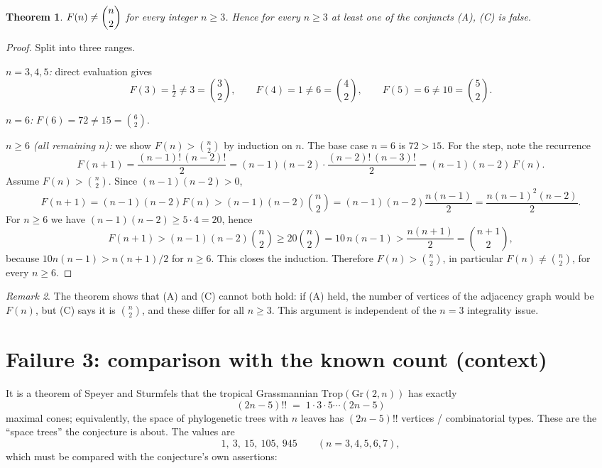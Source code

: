 \documentclass[11pt]{article}
\newtheorem{theorem}{Theorem}
\theoremstyle{definition}
\theoremstyle{remark}
\newtheorem{remark}[theorem]{Remark}
\begin{document}
\begin{theorem}
\label{thm:mismatch}
$F(n) \neq \dbinom{n}{2}$ for every integer $n \ge 3$. Hence for every $n \ge 3$ at
least one of the conjuncts (A), (C) is false.
\end{theorem}

\begin{proof}
Split into three ranges.

\emph{$n = 3,4,5$:} direct evaluation gives
\[
F(3) = \tfrac12 \neq 3 = \binom{3}{2},\qquad
F(4) = 1 \neq 6 = \binom{4}{2},\qquad
F(5) = 6 \neq 10 = \binom{5}{2}.
\]

\emph{$n = 6$:} $F(6) = 72 \neq 15 = \binom{6}{2}$.

\emph{$n \ge 6$ (all remaining $n$):} we show $F(n) > \binom{n}{2}$ by induction on
$n$. The base case $n = 6$ is $72 > 15$. For the step, note the recurrence
\[
F(n+1) = \frac{(n-1)!\,(n-2)!}{2}
       = (n-1)(n-2) \cdot \frac{(n-2)!\,(n-3)!}{2}
       = (n-1)(n-2)\,F(n).
\]
Assume $F(n) > \binom{n}{2}$. Since $(n-1)(n-2) > 0$,
\[
F(n+1) = (n-1)(n-2) F(n) > (n-1)(n-2)\binom{n}{2}
       = (n-1)(n-2)\frac{n(n-1)}{2} = \frac{n(n-1)^2(n-2)}{2}.
\]
For $n \ge 6$ we have $(n-1)(n-2) \ge 5 \cdot 4 = 20$, hence
\[
F(n+1) > (n-1)(n-2)\binom{n}{2} \ge 20\binom{n}{2} = 10\,n(n-1)
      > \frac{n(n+1)}{2} = \binom{n+1}{2},
\]
because $10n(n-1) > n(n+1)/2$ for $n \ge 6$. This closes the induction. Therefore
$F(n) > \binom{n}{2}$, in particular $F(n) \neq \binom{n}{2}$, for every $n \ge 6$.
\end{proof}

\begin{remark}
The theorem shows that (A) and (C) cannot both hold: if (A) held, the number of
vertices of the adjacency graph would be $F(n)$, but (C) says it is $\binom{n}{2}$,
and these differ for all $n \ge 3$. This argument is independent of the
$n = 3$ integrality issue.
\end{remark}

\section{Failure 3: comparison with the known count (context)}

It is a theorem of Speyer and Sturmfels \cite{SpeyerSturmfels} that the tropical
Grassmannian $\mathrm{Trop}(\mathrm{Gr}(2,n))$ has exactly
\[
(2n-5)!! \;=\; 1 \cdot 3 \cdot 5 \cdots (2n-5)
\]
maximal cones; equivalently, the space of phylogenetic trees with $n$ leaves has
$(2n-5)!!$ vertices / combinatorial types. These are the ``space trees'' the
conjecture is about. The values are
\[
1,\ 3,\ 15,\ 105,\ 945 \qquad (n = 3,4,5,6,7),
\]
which must be compared with the conjecture's own assertions:
\end{document}
